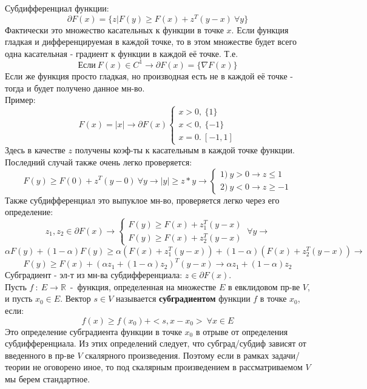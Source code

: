 Субдифференциал функции:
$$\partial F(x)=\{z|F(y) \geq F(x) + z^T(y-x)~\forall y\}$$
Фактически это множество касательных к функции в точке $x$. Если функция гладкая и дифференцируемая в каждой точке, то в этом множестве будет всего одна касательная - градиент к функции в каждой её точке. Т.е.
$$
\text{Если}~F(x) \in C^1 \to \partial F(x)=\{\nabla F(x)\}
$$
Если же функция просто гладкая, но производная есть не в каждой её точке - тогда и будет получено данное мн-во.\\
Пример:\\
$$
F(x)=|x| \to \partial F(x)\begin{cases}
                          x > 0,~\{1\}\\
                          x < 0,~\{-1\}\\
                          x = 0.~[-1,1]
\end{cases}
$$
Здесь в качестве $z$ получены коэф-ты к касательным в каждой точке функции. Последний случай также очень легко проверяется:
$$
F(y) \geq F(0) + z^T(y-0)~\forall y \to |y| \geq z*y \to \begin{cases}
                                                         1)~y>0 \to z \leq 1\\
                                                         2)~y < 0 \to z \geq -1
\end{cases}
$$
Также субдифференциал это выпуклое мн-во, проверяется легко через его определение:
$$
z_1,z_2 \in \partial F(x) \to \begin{cases}
                              F(y) \geq F(x) + z_1^T(y-x)\\
                              F(y) \geq F(x) + z_2^T(y-x)
\end{cases}~\forall y \to
$$
$$
\alpha F(y) + (1-\alpha) F(y) \geq \alpha(F(x) + z_1^T(y-x)) + (1-\alpha)(F(x) + z_2^T(y-x)) \to
$$
$$
F(y) \geq F(x) + (\alpha z_1 + (1-\alpha)z_2)^T(y-x) \to \alpha z_1 + (1-\alpha)z_2
$$
Субградиент - эл-т из мн-ва субдифференциала: $z \in \partial F(x)$.\\
Пусть $f~:~E \to \mathbb{R}$~-~функция, определенная на множестве $E$ в евклидовом пр-ве $V$, и пусть $x_0 \in E$. Вектор $s \in V$ называется {\bf субградиентом} функции $f$ в точке $x_0$, если:
$$
f(x) \geq f(x_0) + <s, x-x_0>~\forall x \in E
$$
Это определение субградиента функции в точке $x_0$ в отрыве от определения субдифференциала. Из этих определений следует, что субград/субдиф зависят от введенного в пр-ве $V$ скалярного произведения. Поэтому если в рамках задачи/теории не оговорено иное, то под скалярным произведением в рассматриваемом $V$ мы берем стандартное.\\

